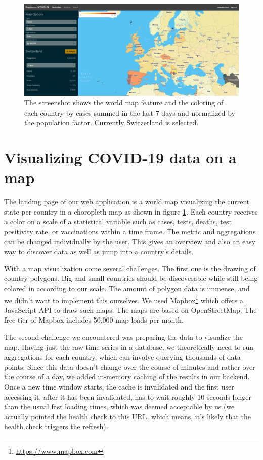 
\begin{figure}
\centerline{\includegraphics[scale=.135]{figs/screenshot-map.png}}
\caption{The screenshot shows the world map feature and the coloring of each country by cases summed in the last 7 days and normalized by the population factor. Currently Switzerland is selected.}
\label{fig:screenshot-map}
\end{figure}


\section{Visualizing COVID-19 data on a map}

The landing page of our web application is a world map visualizing the current state per country in a choropleth map as shown in figure \ref{fig:screenshot-map}. Each country receives a color on a scale of a statistical variable such as cases, tests, deaths, test positivity rate, or vaccinations within a time frame. The metric and aggregations can be changed individually by the user. This gives an overview and also an easy way to discover data as well as jump into a country's details.

With a map visualization come several challenges. The first one is the drawing of country polygons. Big and small countries should be discoverable while still being colored in according to our scale. The amount of polygon data is immense, and we didn't want to implement this ourselves. We used Mapbox\footnote{\href{https://www.mapbox.com}{https://www.mapbox.com}} which offers a JavaScript API to draw such maps. The maps are based on OpenStreetMap. The free tier of Mapbox includes 50,000 map loads per month.

The second challenge we encountered was preparing the data to visualize the map. Having just the raw time series in a database, we theoretically need to run aggregations for each country, which can involve querying thousands of data points. Since this data doesn't change over the course of minutes and rather over the course of a day, we added in-memory caching of the results in our backend. Once a new time window starts, the cache is invalidated and the first user accessing it, after it has been invalidated, has to wait roughly 10 seconds longer than the usual fast loading times, which was deemed acceptable by us (we actually pointed the health check to this URL, which means, it's likely that the health check triggers the refresh).

